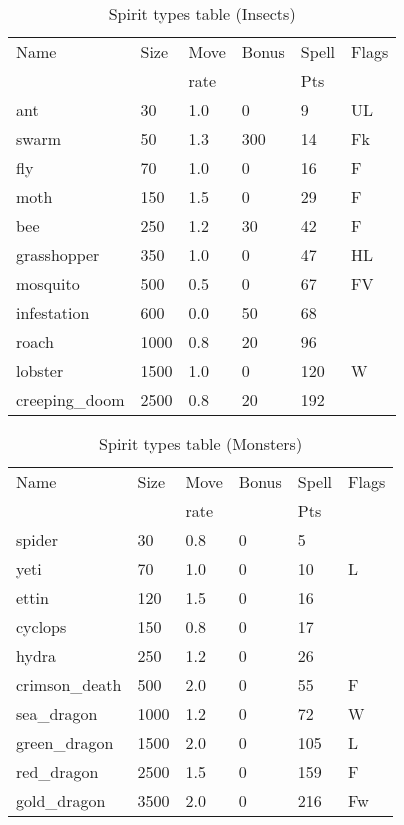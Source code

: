 \begin{same}
\begin{table}[hbpt]
\caption{Spirit types table (Insects)}
\begin{tabular}{ || l | l | l | l | l | l || }
\hline
Name            & Size &Move&Bonus&Spell&Flags\\
                &      &rate&     &Pts  &\\
\hline
ant             &   30 & 1.0&   0 &   9 &UL\\
swarm           &   50 & 1.3& 300 &  14 &Fk\\
fly             &   70 & 1.0&   0 &  16 &F\\
moth            &  150 & 1.5&   0 &  29 &F\\
bee             &  250 & 1.2&  30 &  42 &F\\
grasshopper     &  350 & 1.0&   0 &  47 &HL\\
mosquito        &  500 & 0.5&   0 &  67 &FV\\
infestation     &  600 & 0.0&  50 &  68 &\\
roach           & 1000 & 0.8&  20 &  96 &\\
lobster         & 1500 & 1.0&   0 &  120 &W\\
creeping_doom   & 2500 & 0.8&  20 &  192 &\\
\hline
\end{tabular}
\end{table}
\end{same}
\begin{same}
\begin{table}[hbpt]
\caption{Spirit types table (Monsters)}
\begin{tabular}{ || l | l | l | l | l | l || }
\hline
Name            & Size &Move&Bonus&Spell&Flags\\
                &      &rate&     &Pts  &\\
\hline
spider          &   30 & 0.8&   0 &   5 &\\
yeti            &   70 & 1.0&   0 &  10 &L\\
ettin           &  120 & 1.5&   0 &  16 &\\
cyclops         &  150 & 0.8&   0 &  17 &\\
hydra           &  250 & 1.2&   0 &  26 &\\
crimson_death   &  500 & 2.0&   0 &  55 &F\\
sea_dragon      & 1000 & 1.2&   0 &  72 &W\\
green_dragon    & 1500 & 2.0&   0 &  105 &L\\
red_dragon      & 2500 & 1.5&   0 &  159 &F\\
gold_dragon     & 3500 & 2.0&   0 &  216 &Fw\\
\hline
\end{tabular}
\end{table}
\end{same}
